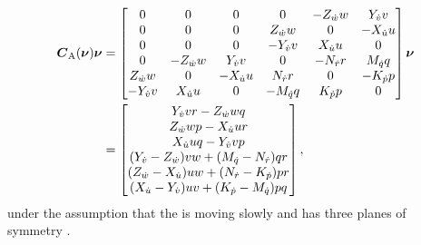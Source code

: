 \begin{align}
    \boldsymbol{C}_\text{A}(\boldsymbol{\nu}) \boldsymbol{\nu} &= 
    \begin{bmatrix}
    0 & 0 & 0 & 0 & -Z_{\dot{w}} w & Y_{\dot{v}} v \\
    0 & 0 & 0 & Z_{\dot{w}} w & 0 & -X_{\dot{u}} u \\
    0 & 0 & 0 & -Y_{\dot{v}} v & X_{\dot{u}} u & 0 \\
    0 & -Z_{\dot{w}} w & Y_{\dot{v}} v & 0 & -N_{\dot{r}} r & M_{\dot{q}} q \\
    Z_{\dot{w}} w & 0 & -X_{\dot{u}} u & N_{\dot{r}} r & 0 & -K_{\dot{p}} p \\
    -Y_{\dot{v}} v & X_{\dot{u}} u & 0 & - M_{\dot{q}} q & K_{\dot{p}} p & 0 \\
    \end{bmatrix}
    \boldsymbol{\nu}\nonumber \\ 
    &= \begin{bmatrix}
        Y_{\dot{v}} v r - Z_{\dot{w}} w q\\
        Z_{\dot{w}} w p - X_{\dot{u}} u r\\
        X_{\dot{u}} u q - Y_{\dot{v}} v p \\
        (Y_{\dot{v}} - Z_{\dot{w}}) v w + (M_{\dot{q}} - N_{\dot{r}}) q r\\
        (Z_{\dot{w}} - X_{\dot{u}}) u w + (N_{\dot{r}} - K_{\dot{p}}) p r\\
        (X_{\dot{u}} - Y_{\dot{v}}) u v + (K_{\dot{p}} - M_{\dot{q}}) p q \\
    \end{bmatrix},
\end{align}
under the assumption that the \abbrROV is moving slowly and has three planes of symmetry \citep[p. 121]{fossen2011}.  

